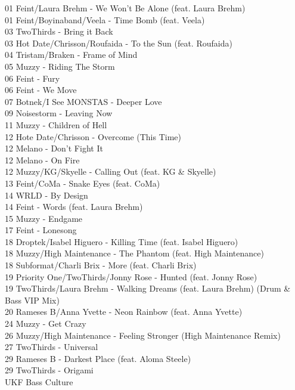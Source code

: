 \begin{multicols}{2}
 01 Feint/Laura Brehm - We Won't Be Alone (feat. Laura Brehm)\\ 01 Feint/Boyinaband/Veela - Time Bomb (feat. Veela)\\ 03 TwoThirds - Bring it Back\\ 03 Hot Date/Chrisson/Roufaida - To the Sun (feat. Roufaida)\\ 04 Tristam/Braken - Frame of Mind\\ 05 Muzzy - Riding The Storm\\ 06 Feint - Fury\\ 06 Feint - We Move\\ 07 Botnek/I See MONSTAS - Deeper Love\\ 09 Noisestorm - Leaving Now\\ 11 Muzzy - Children of Hell\\ 12 Hote Date/Chrisson - Overcome (This Time)\\ 12 Melano - Don't Fight It\\ 12 Melano - On Fire\\ 12 Muzzy/KG/Skyelle - Calling Out (feat. KG \& Skyelle)\\ 13 Feint/CoMa - Snake Eyes (feat. CoMa)\\ 14 WRLD - By Design\\ 14 Feint - Words (feat. Laura Brehm)\\ 15 Muzzy - Endgame\\ 17 Feint - Lonesong\\ 18 Droptek/Isabel Higuero - Killing Time (feat. Isabel Higuero)\\ 18 Muzzy/High Maintenance - The Phantom (feat. High Maintenance)\\ 18 Subformat/Charli Brix - More (feat. Charli Brix)\\ 19 Priority One/TwoThirds/Jonny Rose - Hunted (feat. Jonny Rose)\\ 19 TwoThirds/Laura Brehm - Walking Dreams (feat. Laura Brehm) (Drum \& Bass VIP Mix)\\ 20 Rameses B/Anna Yvette - Neon Rainbow (feat. Anna Yvette)\\ 24 Muzzy - Get Crazy\\ 26 Muzzy/High Maintenance - Feeling Stronger (High Maintenance Remix)\\ 27 TwoThirds - Universal\\ 29 Rameses B - Darkest Place (feat. Aloma Steele)\\ 29 TwoThirds - Origami\\
 \large UKF Bass Culture \normalsize\\

\end{multicols}

